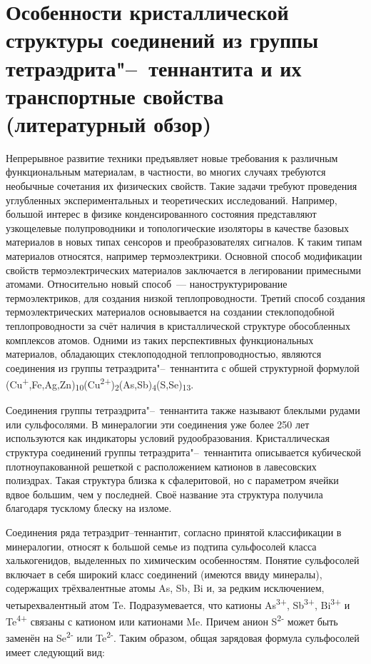 \chapter{Особенности кристаллической структуры соединений из группы тетраэдрита"--~теннантита и их транспортные свойства (литературный обзор)} \label{chapt1}

Непрерывное развитие техники предъявляет новые требования к различным функциональным материалам, в частности, во многих случаях требуются необычные сочетания их физических свойств.
Такие задачи требуют проведения углубленных экспериментальных и теоретических исследований. Например, большой интерес в физике конденсированного состояния представляют узкощелевые полупроводники и топологические изоляторы в качестве базовых материалов в новых типах сенсоров и преобразователях сигналов. К таким типам материалов относятся, например термоэлектрики.
Основной способ модификации свойств термоэлектрических материалов заключается в легировании примесными атомами. Относительно новый способ~--- наноструктурирование термоэлектриков, для создания низкой теплопроводности. Третий способ создания термоэлектрических материалов основывается на создании стеклоподобной теплопроводности за счёт наличия в кристаллической структуре обособленных комплексов атомов. Одними из таких перспективных функциональных материалов, обладающих стеклопододной теплопроводностью, являются соединения из группы тетраэдрита"--~теннантита с обшей структурной формулой (Cu\textsuperscript{+},Fe,Ag,Zn)\textsubscript{10}(Cu\textsuperscript{2+})\textsubscript{2}(As,Sb)\textsubscript{4}(S,Se)\textsubscript{13}.

Соединения группы тетраэдрита"--~теннантита также называют блеклыми рудами или сульфосолями. В минералогии эти соединения уже более 250 лет используются как индикаторы условий рудообразования. Кристаллическая структура соединений группы тетраэдрита"--~теннантита описывается кубической плотноупакованной решеткой с расположением катионов в лавесовских полиэдрах. Такая структура близка к сфалеритовой, но с параметром ячейки вдвое большим, чем у последней. Своё название эта структура получила благодаря тусклому блеску на изломе.

Соединения ряда тетраэдрит--теннантит, согласно принятой классификации в минералогии\cite{Molo2008}, относят к большой семье из подтипа сульфосолей класса халькогенидов, выделенных по химическим особенностям.
Понятие сульфосолей включает в себя широкий класс соединений (имеются ввиду минералы), содержащих трёхвалентные атомы As, Sb, Bi и, за редким исключением, четырехвалентный атом Te.
Подразумевается, что катионы As\textsuperscript{3+}, Sb\textsuperscript{3+}, Bi\textsuperscript{3+} и Te\textsuperscript{4+} связаны с катионом или катионами Me.
Причем анион  S\textsuperscript{2-} может быть заменён на Se\textsuperscript{2-} или Te\textsuperscript{2-}. Таким образом, общая зарядовая формула сульфосолей имеет следующий вид:

